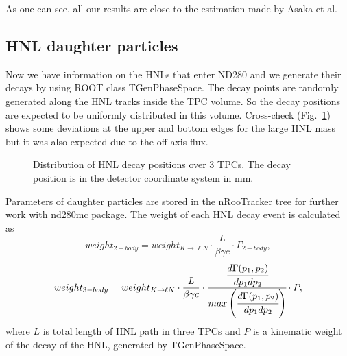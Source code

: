 \documentclass[../main.tex]{subfiles}
\begin{document}
As one can see, all our results are close to the estimation made by Asaka et al.

\subsection{HNL daughter particles}
Now we have information on the HNLs that enter ND280 and we generate their decays by using ROOT class TGenPhaseSpace. The decay points are randomly generated along the  HNL tracks inside the TPC volume. So the decay positions are expected to be uniformly distributed in this volume. Cross-check (Fig.~\ref{fig:HNL:decayPos}) shows some deviations at the upper and bottom edges for the large HNL mass but it was also expected due to the off-axis flux.

\begin{figure}[!ht]
    \caption{Distribution of HNL decay positions over 3 TPCs. The decay position is in the detector coordinate system in mm.}
    \label{fig:HNL:decayPos}
\end{figure}

Parameters of daughter particles are stored in the  nRooTracker tree for further work with nd280mc package. The weight of each HNL decay event is calculated as
\begin{equation}
    weight_{2-body}=weight_{K\rightarrow \ell N}\cdot\frac{L}{\beta\gamma c}\cdot\Gamma_{2-body},
\end{equation}
\begin{equation}
    weight_{3-body}=weight_{K\rightarrow \ell N}\cdot\frac{L}{\beta\gamma c}\cdot\cfrac{\cfrac{d\Gamma(p_1,p_2)}{dp_1dp_2}}{max\left(\cfrac{d\Gamma(p_1,p_2)}{dp_1dp_2}\right)}\cdot P,
\end{equation}
where $L$ is total length of HNL path in three TPCs and $P$ is a kinematic weight of the decay of the HNL, generated by TGenPhaseSpace.
\end{document}

